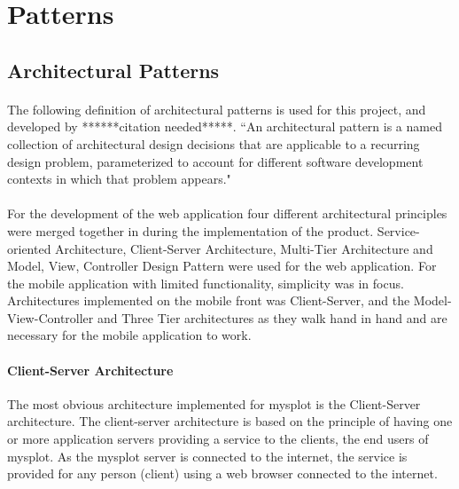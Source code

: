 \newpage
\section{Patterns}



\subsection{Architectural Patterns}
\paragraph{} The following definition of architectural patterns is used for this project, and developed by ******citation needed*****. 
\bigskip
``An architectural pattern is a named collection of architectural design decisions that are applicable to a recurring design problem, parameterized to account for different software development contexts in which that problem appears."

\paragraph{} For the development of the web application four different architectural principles were merged together in during the implementation of the product. Service-oriented Architecture, Client-Server Architecture, Multi-Tier Architecture and Model, View, Controller Design Pattern were used for the web application. For the mobile application with limited functionality, simplicity was in focus. Architectures implemented on the mobile front was Client-Server, and the Model-View-Controller and Three Tier architectures as they walk hand in hand and are necessary for the mobile application to work. 

\paragraph{Client-Server Architecture} The most obvious architecture implemented for mysplot is the Client-Server architecture. The client-server architecture is based on the principle of having one or more application servers providing a service to the clients, the end users of mysplot. As the mysplot server is connected to the internet, the service is provided for any person (client) using a web browser connected to the internet. 

